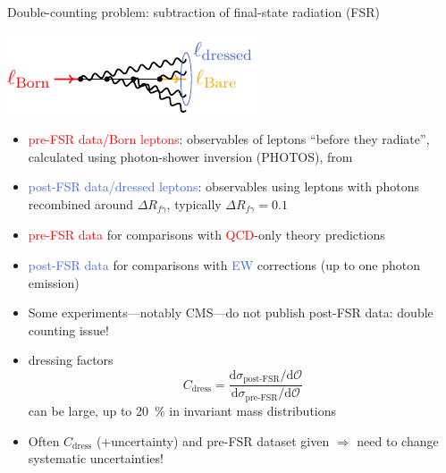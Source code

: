 \begin{frame}{Double-counting problem: subtraction of final-state radiation (FSR)}
\fontsize{9}{11}\selectfont
\begin{center}
\includegraphics[height=0.2\textheight]{ew_corrections/figures/fd05_photon_radiation}
\end{center}
\begin{itemize}
\item \textcolor{red}{pre-FSR data/Born leptons}: observables of leptons \enquote{before they radiate}, calculated using photon-shower inversion (\textrm{\textsc{PHOTOS}}), from
\item \textcolor{RoyalBlue}{post-FSR data/dressed leptons}: observables using leptons with photons recombined around $\Delta R_{f \gamma}$, typically $\Delta R_{f \gamma} = 0.1$
\end{itemize}
\begin{itemize}
\item \textcolor{red}{pre-FSR data} for comparisons with \textcolor{red}{QCD}-only theory predictions
\item \textcolor{RoyalBlue}{post-FSR data} for comparisons with \textcolor{RoyalBlue}{EW} corrections (up to one photon emission)
\end{itemize}

\vspace*{\fill}

\begin{itemize}
\item Some experiments---notably CMS---do not publish post-FSR data: double counting issue!
\item dressing factors
\begin{equation*}
C_\text{dress} = \frac{\mathrm{d} \sigma_\text{post-FSR} / \mathrm{d} \mathcal{O}}{\mathrm{d} \sigma_\text{pre-FSR} / \mathrm{d} \mathcal{O}}
\end{equation*}
can be large, \alert{up to \SI{20}{\percent}} in invariant mass distributions
\item Often $C_\text{dress}$ (+uncertainty) and pre-FSR dataset given $\Rightarrow$ need to change systematic uncertainties!
\end{itemize}
\end{frame}

